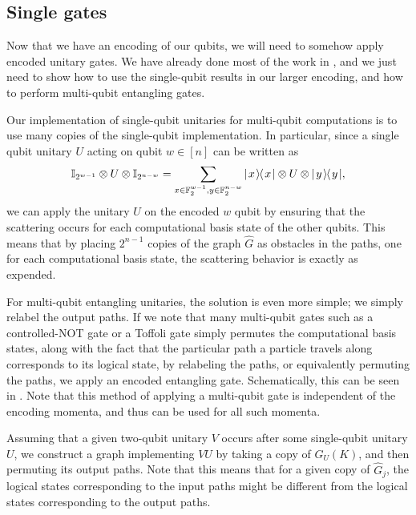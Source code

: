 \documentclass[../thesis-main/thesis-main]{subfiles}
\begin{document}
\subsection{Single gates}\label{sec:multi_qubit_single_gate}

Now that we have an encoding of our qubits, we will need to somehow apply encoded unitary gates.  We have already done most of the work in , and we just need to show how to use the single-qubit results in our larger encoding, and how to perform multi-qubit entangling gates.

Our implementation of single-qubit unitaries for multi-qubit computations is to use many copies of the single-qubit implementation.  In particular, since a single qubit unitary $U$ acting on qubit $w\in [n]$ can be written as
\begin{align}
  \mathbb{I}_{2^{w-1}} \otimes U \otimes \mathbb{I}_{2^{n-w}} = \sum_{x \in \mathbb{F}_2^{w-1}, y\in \mathbb{F}_2^{n-w}} |\mspace{2mu} x \mspace{2mu} \rangle\mspace{-2mu}\langle\mspace{2mu} x \mspace{2mu} | \otimes U \otimes |\mspace{2mu} y \mspace{2mu} \rangle\mspace{-2mu}\langle\mspace{2mu} y \mspace{2mu} |,
\end{align}
we can apply the unitary $U$ on the encoded $w$ qubit by ensuring that the scattering occurs for each computational basis state of the other qubits.  This means that by placing $2^{n-1}$ copies of the graph $\widehat{G}$ as obstacles in the paths, one for each computational basis state, the scattering behavior is exactly as expended.  




For multi-qubit entangling unitaries, the solution is even more simple; we simply relabel the output paths.  If we note that many multi-qubit gates such as a controlled-NOT gate or a Toffoli gate simply permutes the computational basis states, along with the fact that the particular path a particle travels along corresponds to its logical state, by relabeling the paths, or equivalently permuting the paths, we apply an encoded entangling gate.  Schematically, this can be seen in .  Note that this method of applying a multi-qubit gate is independent of the encoding momenta, and thus can be used for all such momenta.  

Assuming that a given two-qubit unitary $V$ occurs after some single-qubit unitary $U$, we construct a graph implementing $VU$ by taking a copy of $G_U(K)$, and then permuting its output paths.  Note that this means that for a given copy of $\widehat{G}_j$, the logical states corresponding to the input paths might be different from the logical states corresponding to the output paths.
\end{document}
